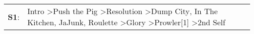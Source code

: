 \begin{supertabular}{p{0.03\textwidth}p{0.92\textwidth}}
 \textbf{S1}:  &  Intro\textsuperscript{} \textgreater \enspace Push the Pig\textsuperscript{} \textgreater \enspace Resolution\textsuperscript{} \textgreater \enspace Dump City\textsuperscript{}, \enspace In The Kitchen\textsuperscript{}, \enspace JaJunk\textsuperscript{}, \enspace Roulette\textsuperscript{} \textgreater \enspace Glory\textsuperscript{} \textgreater \enspace Prowler[1]\textsuperscript{} \textgreater \enspace 2nd Self\textsuperscript{}  \enspace  \\
\end{supertabular}
